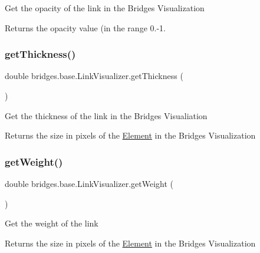 Get the opacity of the link in the Bridges Visualization \begin{DoxyReturn}{Returns}
the opacity value (in the range 0.-\/1. 
\end{DoxyReturn}
\hypertarget{classbridges_1_1base_1_1_link_visualizer_af1592d2a8664b00c1a51fdc0f8d1860a}{}\label{classbridges_1_1base_1_1_link_visualizer_af1592d2a8664b00c1a51fdc0f8d1860a} 
\subsubsection{\texorpdfstring{get\+Thickness()}{getThickness()}}
{\footnotesize\ttfamily double bridges.\+base.\+Link\+Visualizer.\+get\+Thickness (\begin{DoxyParamCaption}{ }\end{DoxyParamCaption})}

Get the thickness of the link in the Bridges Visualiation

\begin{DoxyReturn}{Returns}
the size in pixels of the \hyperlink{classbridges_1_1base_1_1_element}{Element} in the Bridges Visualization 
\end{DoxyReturn}
\hypertarget{classbridges_1_1base_1_1_link_visualizer_ac96d7fb118ae6c7e1bdd57c5e2c8639a}{}\label{classbridges_1_1base_1_1_link_visualizer_ac96d7fb118ae6c7e1bdd57c5e2c8639a} 
\subsubsection{\texorpdfstring{get\+Weight()}{getWeight()}}
{\footnotesize\ttfamily double bridges.\+base.\+Link\+Visualizer.\+get\+Weight (\begin{DoxyParamCaption}{ }\end{DoxyParamCaption})}

Get the weight of the link

\begin{DoxyReturn}{Returns}
the size in pixels of the \hyperlink{classbridges_1_1base_1_1_element}{Element} in the Bridges Visualization 
\end{DoxyReturn}
\hypertarget{classbridges_1_1base_1_1_link_visualizer_a8c77064e7f40caaf8c3ecda830273a7d}{}\label{classbridges_1_1base_1_1_link_visualizer_a8c77064e7f40caaf8c3ecda830273a7d} 

